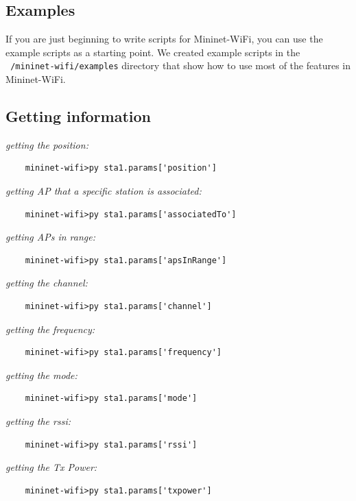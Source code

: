 \subsection{Examples}
If you are just beginning to write scripts for Mininet-WiFi, you can use the example scripts as a starting point. We created example scripts in the \texttt{~/mininet-wifi/examples} directory that show how to use most of the features in Mininet-WiFi.

\subsection{Getting information}

\noindent \textit{getting the position:}
\begin{verbatim}
    mininet-wifi>py sta1.params['position']
\end{verbatim}

\noindent \textit{getting AP that a specific station is associated:}
\begin{verbatim}
    mininet-wifi>py sta1.params['associatedTo']
\end{verbatim}

\noindent \textit{getting APs in range:}
\begin{verbatim}
    mininet-wifi>py sta1.params['apsInRange']
\end{verbatim}

\noindent \textit{getting the channel:}
\begin{verbatim}
    mininet-wifi>py sta1.params['channel']
\end{verbatim}

\noindent \textit{getting the frequency:}
\begin{verbatim}
    mininet-wifi>py sta1.params['frequency']
\end{verbatim}

\noindent \textit{getting the mode:}
\begin{verbatim}
    mininet-wifi>py sta1.params['mode']
\end{verbatim}

\noindent \textit{getting the rssi:}
\begin{verbatim}
    mininet-wifi>py sta1.params['rssi']
\end{verbatim}

\noindent \textit{getting the Tx Power:}
\begin{verbatim}
    mininet-wifi>py sta1.params['txpower']
\end{verbatim}

